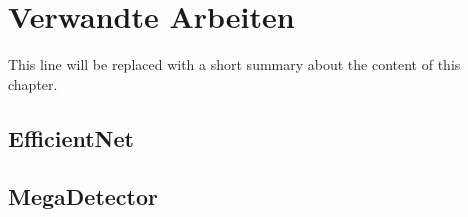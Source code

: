\chapter{Verwandte Arbeiten} \label{chap:relatedwork}

This line will be replaced with a short summary about the content of this chapter.

\section{EfficientNet} \label{sec:efficientnet}


\section{MegaDetector}


